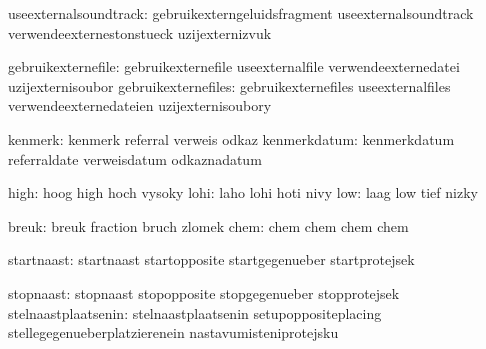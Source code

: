         useexternalsoundtrack:  gebruikexterngeluidsfragment useexternalsoundtrack
                                verwendeexternestonstueck    uzijexternizvuk

           gebruikexternefile:  gebruikexternefile           useexternalfile
                                verwendeexternedatei         uzijexternisoubor
          gebruikexternefiles:  gebruikexternefiles          useexternalfiles
                                verwendeexternedateien       uzijexternisoubory

                      kenmerk:  kenmerk                      referral
                                verweis                      odkaz
                 kenmerkdatum:  kenmerkdatum                 referraldate
                                verweisdatum                 odkaznadatum

                         high:  hoog                         high
                                hoch                         vysoky
                         lohi:  laho                         lohi
                                hoti                         nivy
                          low:  laag                         low
                                tief                         nizky


                        breuk:  breuk                        fraction
                                bruch                        zlomek
                         chem:  chem                         chem
                                chem                         chem

                   startnaast:  startnaast                   startopposite
                                startgegenueber              startprotejsek

                    stopnaast:  stopnaast                    stopopposite
                                stopgegenueber               stopprotejsek
          stelnaastplaatsenin:  stelnaastplaatsenin          setupoppositeplacing
                                stellegegenueberplatzierenein nastavumisteniprotejsku

